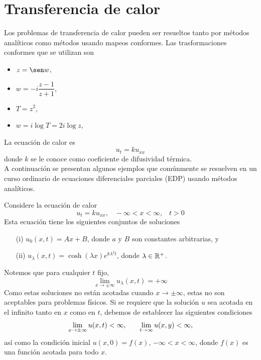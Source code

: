 \section{Transferencia de calor}
Los problemas de transferencia de calor pueden ser resueltos tanto por métodos analíticos como métodos usando mapeos conformes. Las trasformaciones conformes que se utilizan son
\begin{itemize}
	\item $z=\sen w$,
	\item $w=-i\dfrac{z-1}{z+1}$,
	\item $T=z^2$,
	\item  $w=i\log T=2i\log z$,
\end{itemize}
La ecuación de calor es 
\begin{equation}\label{ec3-8}
	u_t=ku_{xx}
\end{equation}
donde $k$ se le conoce como coeficiente de difusividad térmica.\\
A continuación se presentan algunos ejemplos que comúnmente se resuelven en un curso ordinario de ecuaciones diferenciales parciales (EDP) usando métodos analíticos.
\begin{Ejem}
	Considere la ecuación de calor 
	$$u_t=ku_{xx},\;\;\; -\infty<x<\infty,\;\;\;t>0$$
	Esta ecuación tiene los siguientes conjuntos de soluciones 
	\begin{itemize}
		\item [(i)] $u_0(x,t)=Ax+B$, donde $a$ y $B$ son constantes arbitrarias, y
		\item [(ii)]  $u_\lambda(x,t)=\cosh(\lambda x)e^{{k\lambda^2t}}$, donde $\lambda\in\mathbb{R}^{+}$.
	\end{itemize}
	Notemos que para cualquier $t$ fijo, 
	$$\lim_{x\rightarrow\pm\infty}u_\lambda(x,t)=+\infty$$
	Como estas soluciones no están acotadas cuando $x\rightarrow\pm\infty$, estas no son aceptables para problemas físicos. Si se requiere que la solución $u$ sea acotada en el infinito tanto en $x$ como en $t$, debemos  de establecer las siguientes condiciones 
	\[
	\begin{array}{ccc}
		\displaystyle\lim_{x\rightarrow\pm\infty}u(x,t)<\infty,&&\displaystyle\lim_{t\rightarrow\infty}u(x,y)<\infty,
	\end{array}
	\]
	así como la condición inicial $u(x,0)=f(x)$, $-\infty<x<\infty$, donde $f(x)$ es una función acotada para todo $x$.\endproof
\end{Ejem}
